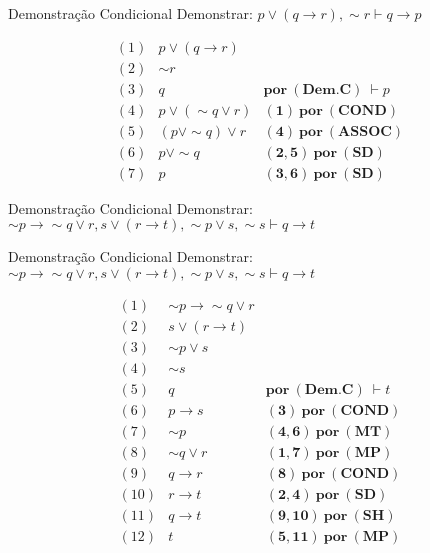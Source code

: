 \begin{frame}[t]{Demonstração Condicional}
	Demonstrar: $p \vee (q \rightarrow r), \sim r \vdash q \rightarrow p$
	
	\vskip 0.5cm
	
	$$\begin{array}{lll}
	(1) & p \vee (q \rightarrow r) & \\
	(2) & \sim r & \\
	(3) & q & \mathbf{por~(Dem.C)~} \vdash p \\
	\hline
	(4) & p \vee (\sim q \vee r) & \mathbf{(1)~por~(COND)} \\
	(5) & (p \vee\sim q) \vee r & \mathbf{(4)~por~(ASSOC)} \\
	(6) & p \vee\sim q & \mathbf{(2,5)~por~(SD)} \\
	(7) & p & \mathbf{(3,6)~por~(SD)} 
	\end{array}$$	
\end{frame}


\begin{frame}[t]{Demonstração Condicional}
	Demonstrar: $\sim p \rightarrow\sim q \vee r, s \vee (r \rightarrow t), \sim p \vee s, \sim s \vdash q \rightarrow t$
\end{frame}


\begin{frame}[t]{Demonstração Condicional}
	Demonstrar: $\sim p \rightarrow\sim q \vee r, s \vee (r \rightarrow t), \sim p \vee s, \sim s \vdash q \rightarrow t$
	
	\vskip 0.5cm
	
	$$\begin{array}{lll}
	(1) & \sim p \rightarrow\sim q \vee r & \\
	(2) & s \vee (r \rightarrow t) & \\
	(3) & \sim p \vee s & \\
	(4) & \sim s & \\
	(5) & q & \mathbf{por~(Dem.C)~} \vdash t \\
	\hline
	(6) & p \rightarrow s & \mathbf{(3)~por~(COND)} \\
	(7) & \sim p & \mathbf{(4,6)~por~(MT)} \\
	(8) & \sim q \vee r & \mathbf{(1,7)~por~(MP)} \\
	(9) & q \rightarrow r & \mathbf{(8)~por~(COND)} \\
	(10) & r \rightarrow t & \mathbf{(2,4)~por~(SD)} \\
	(11) & q \rightarrow t & \mathbf{(9,10)~por~(SH)} \\
	(12) & t & \mathbf{(5,11)~por~(MP)} 
	\end{array}$$	
\end{frame}



